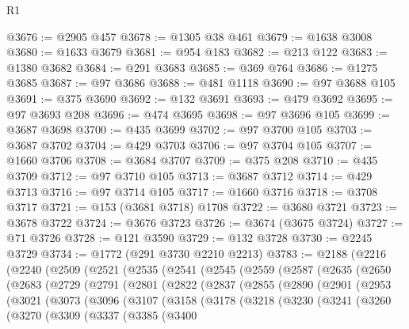 \begin{lexlean}{R1}
\begin{coremodule}
{{{{{{{{{{{{{{{{{{{{{{{{{{{{{{{{{{{{{{{{{{{{{{{{{{{{{{{{{{{{{{{{{{{{{{{{{{{{{{{{{{{{{{{{{{{{{{{{{{{{{{{{{{{{{{{{{{{{{{{{{{{{{{{{{{{{{{{{{{{{{{{{{{{{{{{{{{{{{{{{{{{{{{{{{{{{{{{{{{{{{{{{{{@3676 := @2905 @457
@3678 := @1305 @38 @461
@3679 := @1638 @3008
@3680 := @1633 @3679
@3681 := @954 @183
@3682 := @213 @122
@3683 := @1380 @3682
@3684 := @291 @3683
@3685 := @369 @764
@3686 := @1275 @3685
@3687 := @97 @3686
@3688 := @481 @1118
@3690 := @97 @3688 @105
@3691 := @375 @3690
@3692 := @132 @3691
@3693 := @479 @3692
@3695 := @97 @3693 @208
@3696 := @474 @3695
@3698 := @97 @3696 @105
@3699 := @3687 @3698
@3700 := @435 @3699
@3702 := @97 @3700 @105
@3703 := @3687 @3702
@3704 := @429 @3703
@3706 := @97 @3704 @105
@3707 := @1660 @3706
@3708 := @3684 @3707
@3709 := @375 @208
@3710 := @435 @3709
@3712 := @97 @3710 @105
@3713 := @3687 @3712
@3714 := @429 @3713
@3716 := @97 @3714 @105
@3717 := @1660 @3716
@3718 := @3708 @3717
@3721 := @153 (@3681 @3718) @1708
@3722 := @3680 @3721
@3723 := @3678 @3722
@3724 := @3676 @3723
@3726 := @3674 (@3675 @3724)
@3727 := @71 @3726
@3728 := @121 @3590
@3729 := @132 @3728
@3730 := @2245 @3729
@3734 := @1772 (@291 @3730 @2210 @2213)
@3783 := @2188
    (@2216
      (@2240
        (@2509
          (@2521
            (@2535
              (@2541
                (@2545
                  (@2559
                    (@2587
                      (@2635
                        (@2650
                          (@2683
                            (@2729
                              (@2791
                                (@2801
                                  (@2822
                                    (@2837
                                      (@2855
                                        (@2890
                                          (@2901
                                            (@2953
                                              (@3021
                                                (@3073
                                                  (@3096
                                                    (@3107
                                                      (@3158
                                                        (@3178
                                                          (@3218
                                                            (@3230
                                                              (@3241
                                                                (@3260
                                                                  (@3270
                                                                    (@3309
                                                                      (@3337
                                                                        (@3385
                                                                          (@3400
}}}}}}}}}}}}}}}}}}}}}}}}}}}}}}}}}}}}}}}}}}}}}}}}}}}}}}}}}}}}}}}}}}}}}}}}}}}}}}}}}}}}}}}}}}}}}}}}}}}}}}}}}}}}}}}}}}}}}}}}}}}}}}}}}}}}}}}}}}}}}}}}}}}}}}}}}}}}}}}}}}}}}}}}}}}}}}}}}}}}}}}}}}
\end{coremodule}
\end{lexlean}
